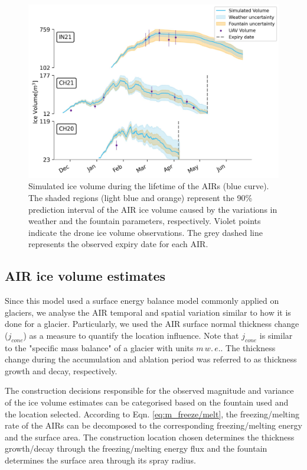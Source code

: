\documentclass[utf8]{frontiersSCNS}
\begin{document}
\begin{figure}
	\begin{center}
		\includegraphics[width=\linewidth]{Figures/Figure_6.jpg}
	\end{center}
	\caption{Simulated ice volume during the lifetime of the AIRs (blue curve). The shaded regions (light blue and
		orange) represent the 90\% prediction interval of the AIR ice volume caused by the variations in weather and
    the fountain parameters, respectively. Violet points indicate the drone ice volume observations.  The grey
  dashed line represents the observed expiry date for each AIR.  }
	\label{fig:results}
\end{figure}

\subsection{AIR ice volume estimates}

Since this model used a surface energy balance model commonly applied on glaciers, we analyse the AIR temporal
and spatial variation similar to how it is done for a glacier. Particularly, we used the AIR surface normal
thickness change ($j_{cone}$) as a measure to quantify the location influence. Note that $j_{cone}$ is similar
to the "specific mass balance" of a glacier with units $m \, w.\, e.$. The thickness change during the
accumulation and ablation period was referred to as thickness growth and decay, respectively.

The construction decisions responsible for the observed magnitude and variance of the ice volume estimates can
be categorised based on the fountain used and the location selected. According to Eqn.  \ref{eq:m_freeze/melt},
the freezing/melting rate of the AIRs can be decomposed to the corresponding freezing/melting energy and the
surface area. The construction location chosen determines the thickness growth/decay through the
freezing/melting energy flux and the fountain determines the surface area through its spray radius.
\end{document}
